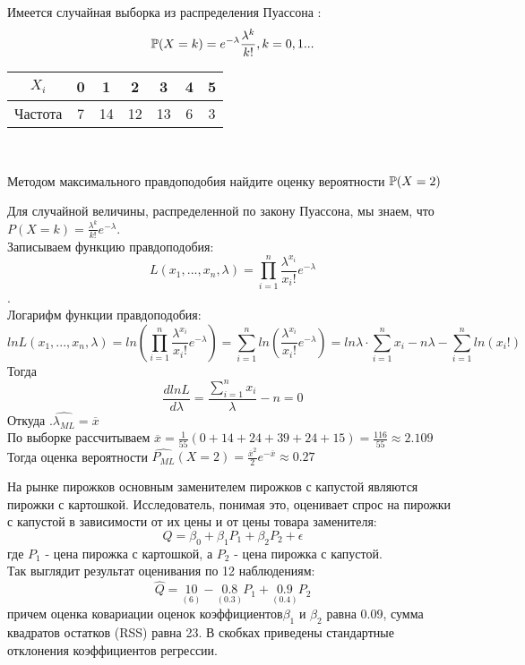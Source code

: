 \documentclass[addpoints, answers]{exam} %
\begin{document}
\begin{questions}
\begin{parts}
\begin{solution}
\end{solution}

\end{parts}

\question Имеется случайная выборка из распределения Пуассона  :
	\[\P(X=k)=e^{-\lambda}\frac{\lambda^k}{k!}, k=0,1...
	\]
	\begin{center}
	\begin{tabular}{c|cccccc}
 $X_i$ &0 & 1 & 2 & 3 & 4 & 5 \\
  \hline
  Частота & 7 & 14 & 12 & 13 &6 & 3\\
\end{tabular} \\
	\end{center}

Методом максимального правдоподобия найдите оценку вероятности  $\P(X=2)$

\begin{solution}
Для случайной величины, распределенной по закону Пуассона, мы знаем, что $P(X=k)=\frac{\lambda^k}{k!}e^{-\lambda}$.\\
Записываем функцию правдоподобия:\\
 \[L(x_1,...,x_n,\lambda)=\prod_{i=1}^{n}\frac{\lambda^{x_i}}{x_i!}e^{-\lambda}\].\\
Логарифм функции правдоподобия: \\
 \[lnL(x_1,...,x_n,\lambda)=ln(\prod_{i=1}^{n}\frac{\lambda^{x_i}}{x_i!}e^{-\lambda})=\sum_{i=1}^{n}ln(\frac{\lambda^{x_i}}{x_i!}e^{-\lambda})=ln \lambda\cdot \sum_{i=1}^{n} x_i -n\lambda-\sum_{i=1}^{n}ln(x_i!) \]
Тогда
 \[
 \frac{d lnL}{d \lambda}=\frac{\sum_{i=1}^{n}x_i}{\lambda}-n=0
 \]
Откуда  .$\hat{\lambda_{ML}}=\overline{x}$\\
По выборке рассчитываем  $\overline{x}=\frac{1}{55}(0+14+24+39+24+15)=\frac{116}{55}\approx 2.109$\\
Тогда оценка вероятности $\hat{P_{ML}}(X=2)=\frac{\overline{x}^2}{2}e^{-\overline{x}}\approx0.27$

\end{solution}

\question На рынке пирожков основным заменителем пирожков с капустой являются пирожки с картошкой. Исследователь, понимая это, оценивает спрос на пирожки с капустой в зависимости от их цены и от цены товара заменителя:
\[ Q=\beta_0+\beta_1P_1+\beta_2P_2+\epsilon
\]
где  $P_1$  - цена пирожка с картошкой, а  $P_2$  - цена пирожка с капустой. \\
Так выглядит результат оценивания по 12 наблюдениям:
 \[ \hat{Q}=\underset{(6)}{10}-\underset{(0.3)}{0.8}P_1+\underset{(0.4)}{0.9}P_2
 \]
причем оценка ковариации оценок коэффициентов$ \beta_1$ и $\beta_2$ равна 0.09, сумма квадратов остатков (RSS) равна 23. В скобках приведены стандартные отклонения коэффициентов регрессии.
\begin{parts}

\end{parts}
\end{questions}
\end{document}
